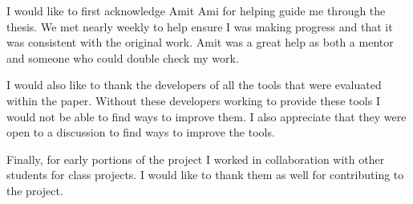 \begin{large}
\begin{flushleft}
\noindent I would like to first acknowledge Amit Ami for helping guide me through the thesis. We met nearly weekly to help ensure I was making progress and that it was consistent with the original work. Amit was a great help as both a mentor and someone who could double check my work. \\
\end{flushleft}

\begin{flushleft}
\noindent I would also like to thank the developers of all the tools that were evaluated within the paper. Without these developers working to provide these tools I would not be able to find ways to improve them. I also appreciate that they were open to a discussion to find ways to improve the tools.\\
\end{flushleft}

\begin{flushleft}
\noindent Finally, for early portions of the project I worked in collaboration with other students for class projects. I would like to thank them as well for contributing to the project.\\
\end{flushleft}


\end{large}